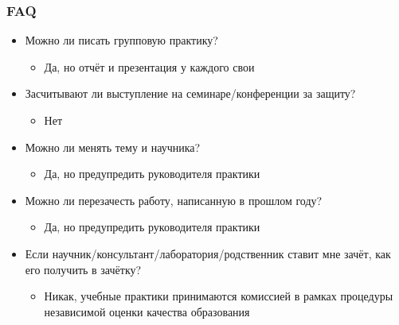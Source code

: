 \documentclass{../../slides-style}
\begin{document}
    \begin{frame}
        \frametitle{FAQ}
        \begin{itemize}
            \item Можно ли писать групповую практику?
            \begin{itemize}
                \item Да, но отчёт и презентация у каждого свои
            \end{itemize}
            \item Засчитывают ли выступление на семинаре/конференции за защиту?
            \begin{itemize}
                \item Нет
            \end{itemize}
            \item Можно ли менять тему и научника?
            \begin{itemize}
                \item Да, но предупредить руководителя практики
            \end{itemize}
            \item Можно ли перезачесть работу, написанную в прошлом году?
            \begin{itemize}
                \item Да, но предупредить руководителя практики
            \end{itemize}
            \item Если научник/консультант/лаборатория/родственник ставит мне зачёт, как его получить в зачётку?
            \begin{itemize}
                \item Никак, учебные практики принимаются комиссией в рамках процедуры независимой оценки качества образования
            \end{itemize}
        \end{itemize}
    \end{frame}
\end{document}
